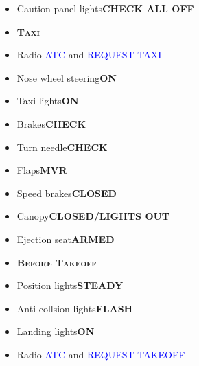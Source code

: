 \documentclass[a4paper,12pt,dvipsnames]{letter}
\newcommand{\radio}[1]{\textcolor{blue}{#1}}
\newcommand{\button}[1]{\textbf{#1}}
\newcommand{\myHead}[1]{{\LARGE\textsc{\textbf{#1}}}}
\begin{document}
{\begin{itemize}
 \item Caution panel lights\dotfill\button{CHECK ALL OFF}
\end{itemize}
\vspace{0.5em}
\begin{itemize}
 \item[] \myHead{Taxi}
 \item Radio \radio{ATC} and \radio{REQUEST TAXI}
 \item Nose wheel steering\dotfill\button{ON}
 \item Taxi lights\dotfill\button{ON}
 \item Brakes\dotfill\button{CHECK}
 \item Turn needle\dotfill\button{CHECK}
 \item Flaps\dotfill\button{MVR}
 \item Speed brakes\dotfill\button{CLOSED}
 \item Canopy\dotfill\button{CLOSED/LIGHTS OUT}
 \item Ejection seat\dotfill\button{ARMED}
\end{itemize}
\newpage
\begin{itemize}
 \item[] \myHead{Before Takeoff}
 \item Position lights\dotfill\button{STEADY}
 \item Anti-collsion lights\dotfill\button{FLASH}
 \item Landing lights\dotfill\button{ON}
 \item Radio \radio{ATC} and \radio{REQUEST TAKEOFF}
\end{itemize}
}
\end{document}
